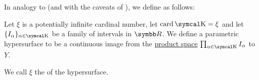 \begin{definition}\label{def:parametric_hypersurface}
  In analogy to  (and with the caveats of ), we define  as follows:

  Let \( \xi \) is a potentially infinite cardinal number, let \( \Card \CK = \xi \) and let \( \{ I_\alpha \}_{\alpha \in \CK} \) be a family of intervals in \( \BR \). We define a parametric hypersurface to be a continuous image from the \hyperref[def:topological_product]{product space} \( \prod_{\alpha \in \CK} I_\alpha \) to \( Y \).

  We call \( \xi \) the  of the hypersurface.
\end{definition}
